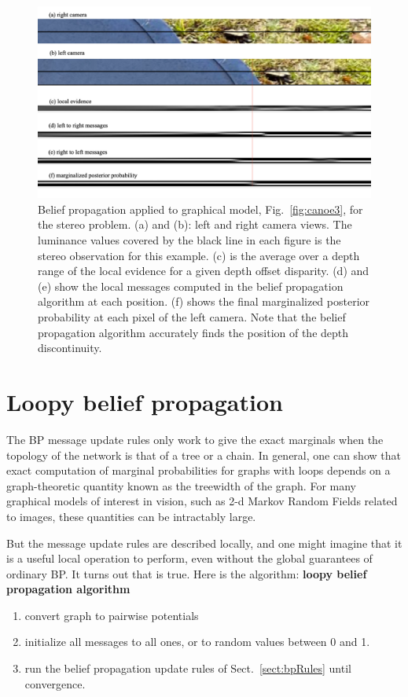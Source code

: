 \begin{figure}
\centerline{
\includegraphics[width=1.0\linewidth]{figures/graphical_models/bpcanoes2.jpg}
}
\caption{Belief propagation applied to graphical model, Fig.~\ref{fig:canoe3}, for the stereo problem. (a) and (b): left and right camera views.  The luminance values covered by the black line in each figure is the stereo observation for this example.  (c) is the average over a depth range of the local evidence for a given depth offset disparity.  (d) and (e) show the local messages computed in the belief propagation algorithm at each position.  (f) shows the final marginalized posterior probability at each pixel of the left camera.  Note that the belief propagation algorithm accurately finds the position of the depth discontinuity.}
\label{fig:canoe4}
\end{figure}


\section{Loopy belief propagation}

The BP message update rules only work to give the exact marginals when
the topology of the network is that of a tree or a chain.   In general, one can show that exact
computation of marginal probabilities for graphs with loops depends on
a graph-theoretic quantity known as the treewidth of the graph.  For
many graphical models of interest in vision, such as 2-d Markov Random
Fields related to images, these quantities can be intractably large.

But the
message update rules are described locally, and one might imagine that
it is a useful local operation to perform, even without the global
guarantees of ordinary BP.   It turns out that is true.   Here is the algorithm:
{\bf loopy belief propagation algorithm}
\begin{enumerate}
\item convert graph to pairwise potentials
\item initialize all messages to all ones, or to random values
 between 0 and 1.
\item  run the belief propagation update rules of
  Sect.~\ref{sect:bpRules} until convergence.
\end{enumerate}


